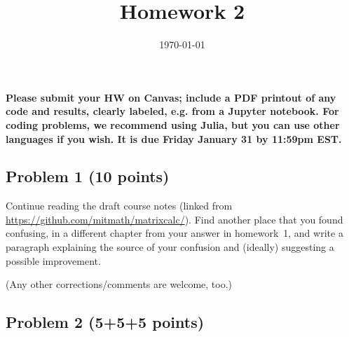 \documentclass[10pt,oneside]{article}
\author{}
\title{Homework 2}
\date{\today}
\begin{document}
\maketitle
\thispagestyle{fancy} 

{\bf Please submit your HW on Canvas; include a PDF printout of any code and results, clearly labeled, e.g. from a Jupyter notebook.  For coding problems, we recommend using Julia, but you can use other languages if you wish. It is due Friday January 31 by 11:59pm EST.  }

\subsection*{Problem 1 (10 points)}

Continue reading the draft course notes (linked from \url{https://github.com/mitmath/matrixcalc/}).   Find another place that you found confusing, in a different chapter from your answer in homework~1, and write a paragraph explaining the source of your confusion and (ideally) suggesting a possible improvement.

(Any other corrections/comments are welcome, too.)

\subsection*{Problem 2 (5+5+5 points)}
\end{document}
